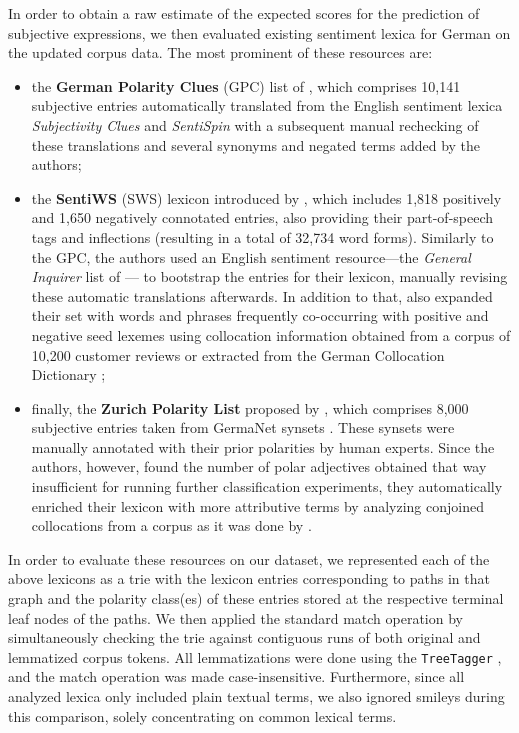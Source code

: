 In order to obtain a raw estimate of the expected scores for the
prediction of subjective expressions, we then evaluated existing
sentiment lexica for German on the updated corpus data.  The most
prominent of these resources are:
\begin{itemize}
\item the \textbf{German Polarity Clues} (GPC) list of
  \citet{Waltinger:10}, which comprises 10,141 subjective entries
  automatically translated from the English sentiment lexica
  \emph{Subjectivity Clues} \cite{Wilson:05} and \emph{SentiSpin}
  \cite{Takamura:05} with a subsequent manual rechecking of these
  translations and several synonyms and negated terms added by the
  authors;

\item the \textbf{SentiWS} (SWS) lexicon introduced by
  \citet{Remus:10}, which includes 1,818 positively and 1,650
  negatively connotated entries, also providing their part-of-speech
  tags and inflections (resulting in a total of 32,734 word forms).
  Similarly to the GPC, the authors used an English sentiment
  resource---the \emph{General Inquirer} list of \citet{Stone:66}---
  to bootstrap the entries for their lexicon, manually revising these
  automatic translations afterwards.  In addition to that,
  \citet{Remus:10} also expanded their set with words and phrases
  frequently co-occurring with positive and negative seed lexemes
  using collocation information obtained from a corpus of 10,200
  customer reviews or extracted from the German Collocation Dictionary
  \cite{Quasthoff:10};

\item finally, the \textbf{Zurich Polarity List} proposed by
  \citet{Clematide:10}, which comprises 8,000 subjective entries taken
  from GermaNet synsets \cite{Hamp:97}.  These synsets were manually
  annotated with their prior polarities by human experts.  Since the
  authors, however, found the number of polar adjectives obtained that
  way insufficient for running further classification experiments,
  they automatically enriched their lexicon with more attributive
  terms by analyzing conjoined collocations from a corpus as it was
  done by \citet{Hatzivassi:97}.
\end{itemize}

In order to evaluate these resources on our dataset, we represented
each of the above lexicons as a trie \cite{Knuth:73} with the lexicon
entries corresponding to paths in that graph and the polarity
class(es) of these entries stored at the respective terminal leaf
nodes of the paths.  We then applied the standard match operation by
simultaneously checking the trie against contiguous runs of both
original and lemmatized corpus tokens.  All lemmatizations were done
using the \texttt{TreeTagger} \cite{Schmid:95}, and the match
operation was made case-insensitive.  Furthermore, since all analyzed
lexica only included plain textual terms, we also ignored smileys
during this comparison, solely concentrating on common lexical terms.

